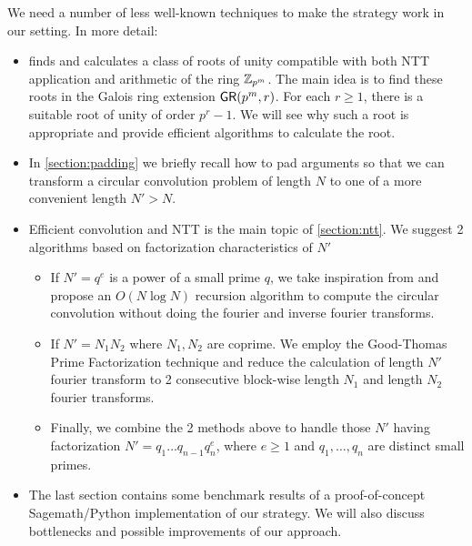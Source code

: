 We need a number of less well-known techniques to make the strategy work in our setting. In more detail:
\begin{itemize}
    \item {} finds and calculates a class of roots of unity compatible with both NTT application and arithmetic of the ring \(\mathbb{Z}_{p^m}\). The main idea is to find these roots in the Galois ring extension \(\mathsf{GR}(p^m, r)\). For each \(r \ge 1\), there is a suitable root of unity of order \(p^r - 1\). We will see why such a root is appropriate and provide efficient algorithms to calculate the root.
    \item In \cref{section:padding} we briefly recall how to pad arguments so that we can transform a circular convolution problem of length \(N\) to one of a more convenient length \(N' > N\).
    \item Efficient convolution and NTT is the main topic of \cref{section:ntt}. We suggest 2 algorithms based on factorization characteristics of \(N'\)
    \begin{itemize}
        \item If \(N' = q^e\) is a power of a small prime \(q\), we take inspiration from \cite{ARXIV:Rosowski21} and propose an \(O(N \log N)\) recursion algorithm to compute the circular convolution without doing the fourier and inverse fourier transforms.
        \item If \(N' = N_1 N_2\) where \(N_1, N_2\) are coprime. We employ the Good-Thomas Prime Factorization technique \cite{JRSS:Good58,ADC:Thomas63} and reduce the calculation of length \(N'\) fourier transform to 2 consecutive block-wise length \(N_1\) and length \(N_2\) fourier transforms.
        \item Finally, we combine the 2 methods above to handle those \(N'\) having factorization \(N' = q_1 \ldots q_{n-1} q_n^e\), where \(e \ge 1\) and \(q_1, \ldots, q_n\) are distinct small primes.
    \end{itemize}
    \item The last section contains some benchmark results of a proof-of-concept Sagemath/Python implementation of our strategy. We will also discuss bottlenecks and possible improvements of our approach.
\end{itemize}


